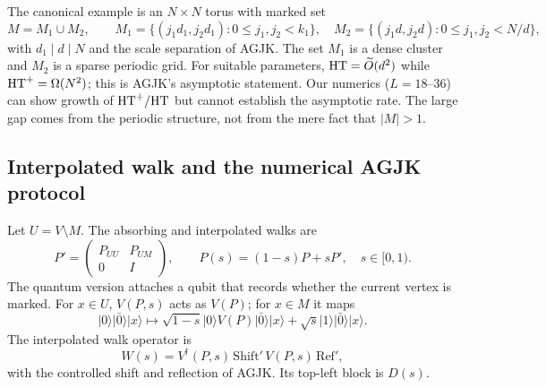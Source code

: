 The canonical example is an $N\times N$ torus with marked set
\begin{equation}
  M=M_1\cup M_2,\qquad
  M_1=\{(j_1d_1,j_2d_1):0\le j_1,j_2<k_1\},\quad
  M_2=\{(j_1d,j_2d):0\le j_1,j_2<N/d\},
  \label{eq:adversarial-set}
\end{equation}
with $d_1\mid d\mid N$ and the scale separation of AGJK. The set $M_1$ is a
dense cluster and $M_2$ is a sparse periodic grid. For suitable parameters,
$\mathrm{HT}=\widetilde O(d^2)$ while $\mathrm{HT}^{+}=\Omega(N^2)$; this is AGJK's asymptotic
statement. Our numerics ($L=18$--$36$) can show growth of $\mathrm{HT}^{+}/\mathrm{HT}$ but cannot
establish the asymptotic rate. The large gap comes from the
periodic structure, not from the mere fact that $|M|>1$.

\subsection{Interpolated walk and the numerical AGJK protocol}
\label{sec:theory-interpolated}

Let $U=V\setminus M$. The absorbing and interpolated walks are
\begin{equation}
  P'=\begin{pmatrix}P_{UU}&P_{UM}\\0&I\end{pmatrix},
  \qquad
  P(s)=(1-s)P+sP',\quad s\in[0,1).
  \label{eq:interpolated-theory}
\end{equation}
The quantum version attaches a qubit that records whether the current vertex is
marked. For $x\in U$, $V(P,s)$ acts as $V(P)$; for $x\in M$ it maps
\begin{equation}
  \lvert0\rangle\lvert\bar0\rangle\lvert x\rangle
  \mapsto
  \sqrt{1-s}\lvert0\rangle V(P)\lvert\bar0\rangle\lvert x\rangle
  +\sqrt{s}\lvert1\rangle\lvert\bar0\rangle\lvert x\rangle.
\end{equation}
The interpolated walk operator is
\begin{equation}
  W(s)=V^\dagger(P,s)\,\mathrm{Shift}'\,V(P,s)\,\mathrm{Ref}',
  \label{eq:interpolated-walk}
\end{equation}
with the controlled shift and reflection of AGJK. Its top-left block is
$D(s)$.


